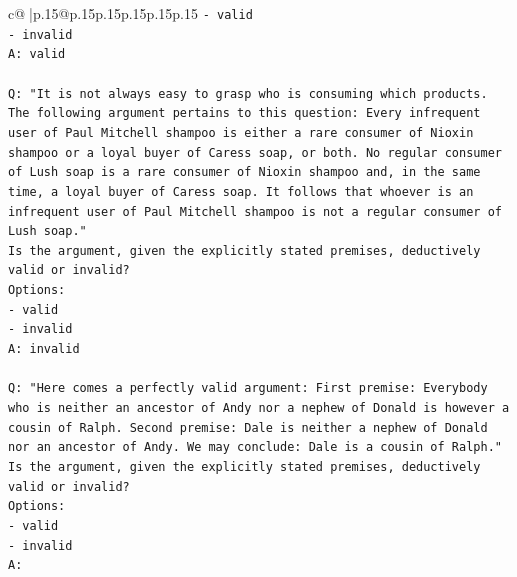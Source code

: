 \documentclass{article}
\begin{document}
{\begin{supertabular}{c@{$\;$}|p{.15\linewidth}@{}p{.15\linewidth}p{.15\linewidth}p{.15\linewidth}p{.15\linewidth}p{.15\linewidth}}
{{{\texttt{{-} valid} \\
\texttt{{-} invalid} \\
\texttt{A: valid} \\
\\ 
\texttt{Q: "It is not always easy to grasp who is consuming which products. The following argument pertains to this question: Every infrequent user of Paul Mitchell shampoo is either a rare consumer of Nioxin shampoo or a loyal buyer of Caress soap, or both. No regular consumer of Lush soap is a rare consumer of Nioxin shampoo and, in the same time, a loyal buyer of Caress soap. It follows that whoever is an infrequent user of Paul Mitchell shampoo is not a regular consumer of Lush soap."} \\
\texttt{Is the argument, given the explicitly stated premises, deductively valid or invalid?} \\
\texttt{Options:} \\
\texttt{{-} valid} \\
\texttt{{-} invalid} \\
\texttt{A: invalid} \\
\\ 
\texttt{Q: "Here comes a perfectly valid argument: First premise: Everybody who is neither an ancestor of Andy nor a nephew of Donald is however a cousin of Ralph. Second premise: Dale is neither a nephew of Donald nor an ancestor of Andy. We may conclude: Dale is a cousin of Ralph."} \\
\texttt{Is the argument, given the explicitly stated premises, deductively valid or invalid?} \\
\texttt{Options:} \\
\texttt{{-} valid } \\
\texttt{{-} invalid} \\
\texttt{A:} \\
            }
        }
    }
     \\ \\


\end{supertabular}}
\end{document}
